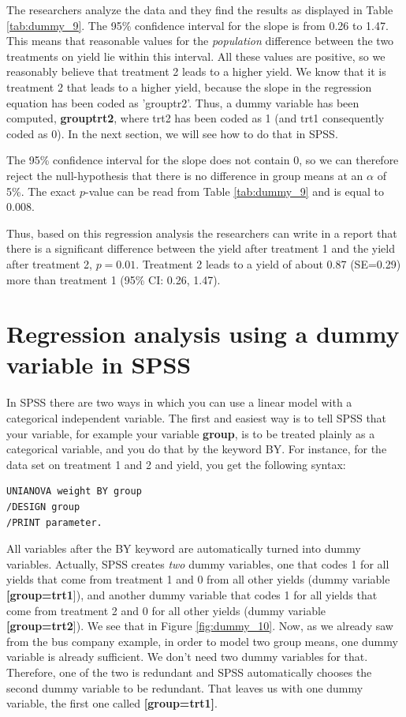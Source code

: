 \documentclass[]{report}\usepackage[]{graphicx}\usepackage[]{color}
\begin{document}
The researchers analyze the data and they find the results as displayed in Table \ref{tab:dummy_9}. The 95\% confidence interval for the slope is from 0.26 to 1.47. This means that reasonable values for the \textit{population} difference between the two treatments on yield lie within this interval. All these values are positive, so we reasonably believe that treatment 2 leads to a higher yield. We know that it is treatment 2 that leads to a higher yield, because the slope in the regression equation has been coded as 'grouptr2'. Thus, a dummy variable has been computed, \textbf{grouptrt2}, where trt2 has been coded as 1 (and trt1 consequently coded as 0). In the next section, we will see how to do that in SPSS.

The 95\% confidence interval for the slope does not contain 0, so we can therefore reject the null-hypothesis that there is no difference in group means at an $\alpha$ of 5\%. The exact $p$-value can be read from Table \ref{tab:dummy_9} and is equal to 0.008.

Thus, based on this regression analysis the researchers can write in a report that there is a significant difference between the yield after treatment 1 and the yield after treatment 2, $p=0.01$. Treatment 2 leads to a yield of about 0.87 (SE=0.29) more than treatment 1 (95\% CI: 0.26, 1.47).

\section{Regression analysis using a dummy variable in SPSS}

In SPSS there are two ways in which you can use a linear model with a categorical independent variable. The first and easiest way is to tell SPSS that your variable, for example your variable \textbf{group}, is to be treated plainly as a categorical variable, and you do that by the keyword BY. For instance, for the data set on treatment 1 and 2 and yield, you get the following syntax:

\begin{verbatim}
UNIANOVA weight BY group 
/DESIGN group
/PRINT parameter.
\end{verbatim}

All variables after the BY keyword are automatically turned into dummy variables. Actually, SPSS creates \textit{two} dummy variables, one that codes 1 for all yields that come from treatment 1 and 0 from all other yields (dummy variable \textbf{[group=trt1}]), and another dummy variable that codes 1 for all yields that come from treatment 2 and 0 for all other yields (dummy variable \textbf{[group=trt2}]). We see that in Figure \ref{fig:dummy_10}. Now, as we already saw from the bus company example, in order to model two group means, one dummy variable is already sufficient. We don't need two dummy variables for that. Therefore, one of the two is redundant and SPSS automatically chooses the second dummy variable to be redundant. That leaves us with one dummy variable, the first one called \textbf{[group=trt1]}. 
\end{document}
